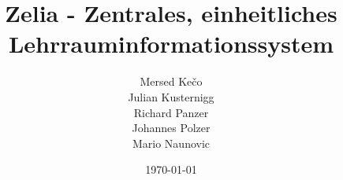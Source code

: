 \title{Zelia - Zentrales, einheitliches Lehrrauminformationssystem }
\author{Mersed Kečo \\
Julian Kusternigg \\
Richard Panzer \\
Johannes Polzer \\
Mario Naunovic
}
\date{\today}